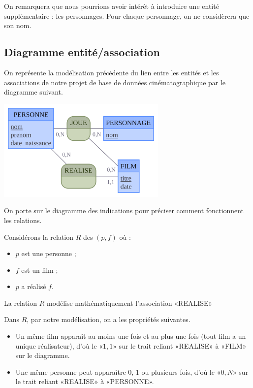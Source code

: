 On remarquera que nous pourrions avoir intérêt à introduire une entité supplémentaire : les personnages. Pour chaque personnage, on ne considèrera que son nom. 

\subsection{Diagramme entité/association}

On représente la modélisation précédente du lien entre les entités et les associations de notre projet de base de données cinématographique par le diagramme suivant.
\begin{center}
\includegraphics[height=5cm]{images/films.png}
\end{center}

On porte sur le diagramme des indications pour préciser comment
fonctionnent les relations.

Considérons la relation $R$ des $(p,f)$ où :
\begin{itemize}
\item $p$ est une personne ;
\item $f$ est un film ;
\item $p$ a réalisé $f$.
\end{itemize}
\begin{rem}
  La relation $R$ modélise mathématiquement l'association «REALISE»
\end{rem}


Dans $R$, par notre modélisation, on a les propriétés suivantes. 
\begin{itemize}
\item Un même film apparaît au moins une fois et au plus une fois
  (tout film a un unique réalisateur), d'où le «$1,1$» sur le trait
  reliant «REALISE» à «FILM» sur le diagramme.
\item Une même personne peut apparaître $0$, $1$ ou plusieurs fois,
  d'où le «$0, N$» sur le trait reliant «REALISE» à «PERSONNE».
\end{itemize}

